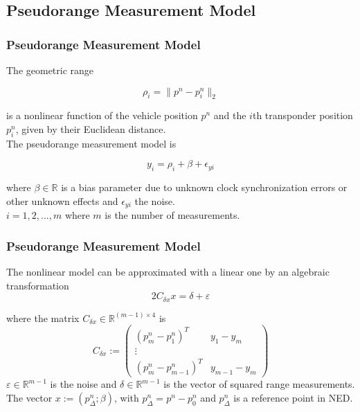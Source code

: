 \documentclass{beamer}
\begin{document}
	\subsection{Pseudorange Measurement Model}
	\begin{frame}
	\frametitle{Pseudorange Measurement Model}
	
	The geometric range 
	
	\[ \rho_i = \|p^n - p^n_i\|_2 \]
	
	is a nonlinear function of the vehicle position $p^n$ and the $i$th transponder position $p^n_i$, given by their Euclidean distance.
	\\ The pseudorange measurement model is
	
	\[ y_i = \rho_i + \beta + \epsilon_{yi} \]
	
	where $\beta \in \mathds{R}$ is a bias parameter due to unknown clock synchronization errors or other unknown effects and $\epsilon_{yi}$ the noise.
	\\ $i = 1,2,...,m$ where $m$ is the number of measurements.
	\end{frame}
	\begin{frame}
	\frametitle{Pseudorange Measurement Model}
	The nonlinear model can be approximated with a linear one
	by an algebraic transformation 
		\[ 2C_{\delta x}x = \delta + \varepsilon  \]
		
	where the matrix $C_{\delta x} \in \mathds{R}^{(m-1)\times4}$ is
	$$
	C_{\delta x} :=
	\begin{pmatrix}
	(p^n_m - p^n_1)^T & y_1 - y_m \\
	\vdots \\
	(p^n_m - p^n_{m-1})^T & y_{m-1} - y_m 
	\end{pmatrix} 
	$$
	\newline
	$\varepsilon \in \mathds{R}^{m-1}$ is the noise and $\delta \in \mathds{R}^{m-1}$ is the vector of squared range measurements.
	The vector $x := (p^n_\Delta;\beta)$, with
	$p_\Delta^n = p^n - p^n_0$ and
	$p_\Delta^n$ is a reference point in NED. 
	\end{frame}


	
\end{document}
